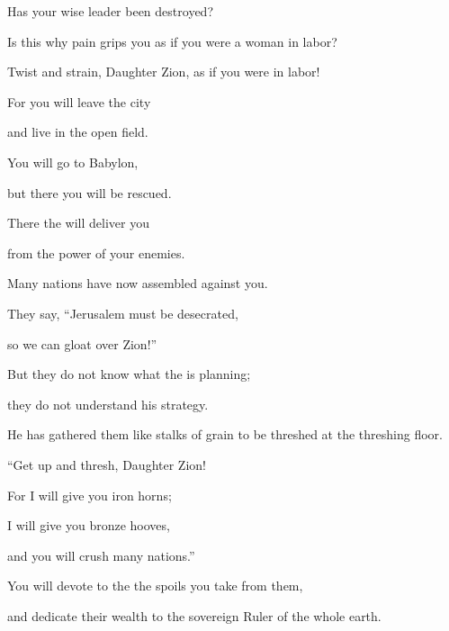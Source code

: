 {\par }{\Q Has your wise leader
been destroyed?
\par }{\Q Is this why
pain
grips
you as if you were a woman in labor?
\par }{\Q {}Twist
and strain,
Daughter
Zion,
as if you were in labor!
\par }{\Q For
you will leave
the city
\par }{\Q and live
in the open field.
\par }{\Q You will go
to
Babylon,
\par }{\Q but there
you will be rescued.
\par }{\Q There
the {}
will deliver you
\par }{\Q from the power
of your enemies.
\par }{\Q {}Many
nations
have now
assembled
against
you.
\par }{\Q They say,
“Jerusalem must be desecrated,
\par }{\Q so we can gloat
over Zion!”
\par }{\Q {}But they
do not
know
what the
{}
is planning;
\par }{\Q they do not
understand
his strategy.
\par }{\Q He has gathered
them like stalks of grain
to be threshed at the threshing floor.
\par }{\Q {}“Get
up and thresh,
Daughter
Zion!
\par }{\Q For
I will give you iron
horns;
\par }{\Q I will give you bronze
hooves,
\par }{\Q and you will crush
many
nations.”
\par }{\Q You will devote
to the
{}
the spoils you take from them,
\par }{\Q and dedicate
their wealth
to the sovereign Ruler
of the whole
earth.

\par }
